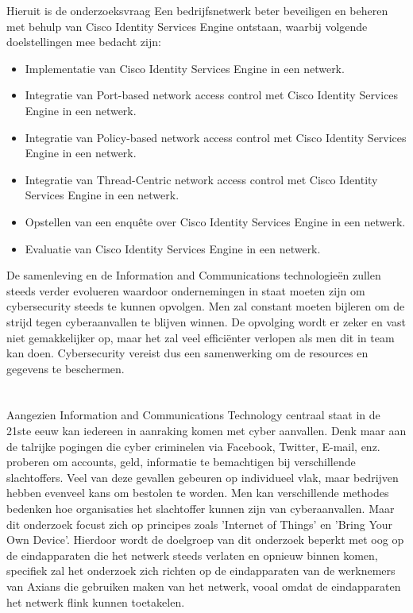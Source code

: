 \newline
\newline
Hieruit is de onderzoeksvraag Een bedrijfsnetwerk beter beveiligen en beheren met behulp van Cisco Identity Services Engine ontstaan, waarbij volgende doelstellingen mee bedacht zijn: 

\begin{itemize}
	\item Implementatie van Cisco Identity Services Engine in een netwerk.
	\item Integratie van Port-based network access control met Cisco Identity Services Engine in een netwerk.
	\item Integratie van Policy-based network access control met Cisco Identity Services Engine in een netwerk.
	\item Integratie van Thread-Centric network access control met Cisco Identity Services Engine in een netwerk.
	\item Opstellen van een enquête over Cisco Identity Services Engine in een netwerk.
	\item Evaluatie van Cisco Identity Services Engine in een netwerk.
\end{itemize}

De samenleving en de Information and Communications technologieën zullen steeds verder evolueren waardoor ondernemingen in staat moeten zijn om cybersecurity steeds te kunnen opvolgen. Men zal constant moeten bijleren om de strijd tegen cyberaanvallen te blijven winnen. De opvolging wordt er zeker en vast niet gemakkelijker op, maar het zal veel efficiënter verlopen als men dit in team kan doen. Cybersecurity vereist dus een samenwerking om de resources en gegevens te beschermen.

\section{}
\label{sec:probleemstelling}
Aangezien Information and Communications Technology centraal staat in de 21ste eeuw kan iedereen in aanraking komen met cyber aanvallen. Denk maar aan de talrijke pogingen die cyber criminelen via Facebook, Twitter, E-mail, enz. proberen om accounts, geld, informatie te bemachtigen bij verschillende slachtoffers. Veel van deze gevallen gebeuren op individueel vlak, maar bedrijven hebben evenveel kans om bestolen te worden. Men kan verschillende methodes bedenken hoe organisaties het slachtoffer kunnen zijn van cyberaanvallen. Maar dit onderzoek focust zich op principes zoals 'Internet of Things' en 'Bring Your Own Device'.
\newline
\newline
Hierdoor wordt de doelgroep van dit onderzoek beperkt met oog op de eindapparaten die het netwerk steeds verlaten en opnieuw binnen komen, specifiek zal het onderzoek zich richten op de eindapparaten van de werknemers van Axians die gebruiken maken van het netwerk, vooal omdat de eindapparaten het netwerk flink kunnen toetakelen.


